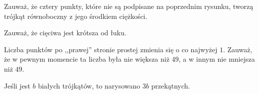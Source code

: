 
\begin{hints_list}
	\item Zauważ, że cztery punkty, które nie są podpisane na poprzednim rysunku, tworzą trójkąt równoboczny z jego środkiem ciężkości.
	\item Zauważ, że cięciwa jest krótsza od łuku.
	\item *
	\item Liczba punktów po ,,prawej'' stronie prostej zmienia się o co najwyżej $1$. Zauważ, że w pewnym momencie ta liczba była nie większa niż $49$, a w innym nie mniejsza niż $49$.
	\item Jeśli jest $b$ białych trójkątów, to narysowano $3b$ przekątnych.
	\item 
\end{hints_list}
